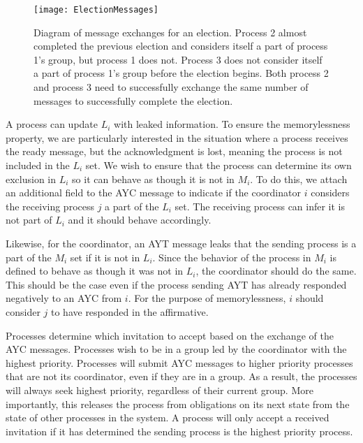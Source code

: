 \begin{figure}[]
\texttt{[image: ElectionMessages]}
\caption[Diagram of message exchanges for an election.]{Diagram of message exchanges for an election. Process 2 almost completed the previous election and considers itself a part of process 1's group, but process 1 does not. Process 3 does not consider itself a part of process 1's group before the election begins. Both process 2 and process 3 need to successfully exchange the same number of messages to successfully complete the election.}
\label{fig:electionmessages}
\end{figure}

A process can update $L_i$ with leaked information.
To ensure the memorylessness property, we are particularly interested in the situation where a process receives the ready message, but the acknowledgment is lost, meaning the process is not included in the $L_i$ set.
We wish to ensure that the process can determine its own exclusion in $L_i$ so it can behave as though it is not in $M_i$.
To do this, we attach an additional field to the \ac{AYC} message to indicate if the coordinator $i$ considers the receiving process $j$ a part of the $L_i$ set.
The receiving process can infer it is not part of $L_i$ and it should behave accordingly.

Likewise, for the coordinator, an \ac{AYT} message leaks that the sending process is a part of the $M_i$ set if it is not in $L_i$.
Since the behavior of the process in $M_i$ is defined to behave as though it was not in $L_i$, the coordinator should do the same.
This should be the case even if the process sending \ac{AYT} has already responded negatively to an \ac{AYC} from $i$.
For the purpose of memorylessness, $i$ should consider $j$ to have responded in the affirmative.

Processes determine which invitation to accept based on the exchange of the \ac{AYC} messages.
Processes wish to be in a group led by the coordinator with the highest priority.
Processes will submit AYC messages to higher priority processes that are not its coordinator, even if they are in a group.
As a result, the processes will always seek highest priority, regardless of their current group.
More importantly, this releases the process from obligations on its next state from the state of other processes in the system.
A process will only accept a received invitation if it has determined the sending process is the highest priority process.

